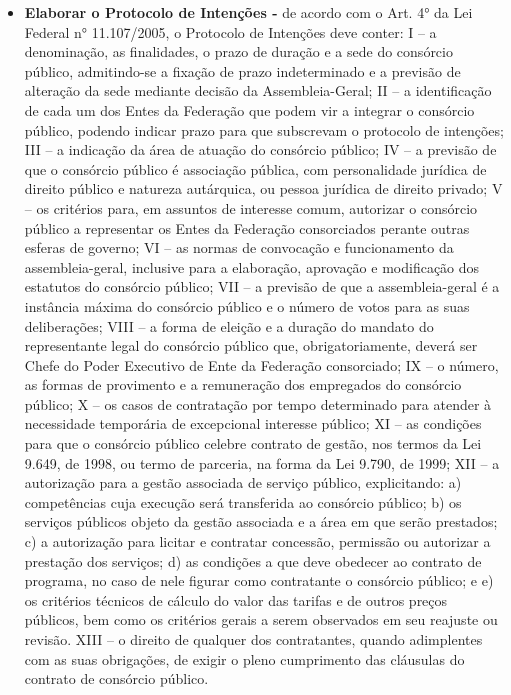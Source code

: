 \begin{itemize}
	\item \textbf{Elaborar o Protocolo de Intenções -} de acordo com o Art. 4° da Lei Federal n° 11.107/2005, o Protocolo de Intenções deve conter:
	\subitem I – a denominação, as finalidades, o prazo de duração e a
	sede do consórcio público, admitindo-se a fixação de prazo
	indeterminado e a previsão de alteração da sede mediante
	decisão da Assembleia-Geral;
	\subitem II – a identificação de cada um dos Entes da Federação
	que podem vir a integrar o consórcio público, podendo indicar prazo para que subscrevam o protocolo de intenções;
	\subitem III – a indicação da área de atuação do consórcio público;
	\subitem IV – a previsão de que o consórcio público é associação
	pública, com personalidade jurídica de direito público e
	natureza autárquica, ou pessoa jurídica de direito privado;
	\subitem V – os critérios para, em assuntos de interesse comum, autorizar o consórcio público a representar os Entes da Federação consorciados perante outras esferas de governo;
	\subitem VI – as normas de convocação e funcionamento da assembleia-geral, inclusive para a elaboração, aprovação e modificação dos estatutos do consórcio público;
	\subitem VII – a previsão de que a assembleia-geral é a instância
	máxima do consórcio público e o número de votos para as
	suas deliberações;
	\subitem VIII – a forma de eleição e a duração do mandato do representante legal do consórcio público que, obrigatoriamente,
	deverá ser Chefe do Poder Executivo de Ente da Federação consorciado;
	\subitem IX – o número, as formas de provimento e a remuneração
	dos empregados do consórcio público;
	\subitem X – os casos de contratação por tempo determinado para
	atender à necessidade temporária de excepcional interesse público;
	\subitem XI – as condições para que o consórcio público celebre
	contrato de gestão, nos termos da Lei 9.649, de 1998, ou
	termo de parceria, na forma da Lei 9.790, de 1999;
	\subitem XII – a autorização para a gestão associada de serviço público, explicitando: a) competências cuja execução será transferida ao
	consórcio público;
	b) os serviços públicos objeto da gestão associada
	e a área em que serão prestados;
	c) a autorização para licitar e contratar concessão,
	permissão ou autorizar a prestação dos serviços;
	d) as condições a que deve obedecer ao contrato
	de programa, no caso de nele figurar como contratante o consórcio público; e
	e) os critérios técnicos de cálculo do valor das tarifas e de outros preços públicos, bem como os critérios gerais a serem observados em seu reajuste
	ou revisão.
	\subitem XIII – o direito de qualquer dos contratantes, quando adimplentes com as suas obrigações, de exigir o pleno cumprimento das cláusulas do contrato de consórcio público.
	

\end{itemize}
